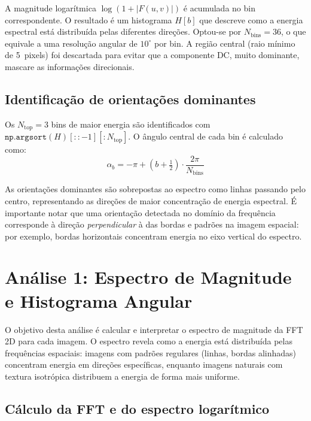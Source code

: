 \documentclass[12pt,a4paper]{article}
\begin{document}
A magnitude logarítmica $\log(1+|F(u,v)|)$ é acumulada no bin correspondente.
O resultado é um histograma $H[b]$ que descreve como a energia espectral está
distribuída pelas diferentes direções.
Optou-se por $N_{\text{bins}} = 36$, o que equivale a uma resolução angular de $10^\circ$ por bin.
A região central (raio mínimo de 5~pixels) foi descartada para evitar que a componente DC,
muito dominante, mascare as informações direcionais.

\subsection{Identificação de orientações dominantes}

Os $N_{\text{top}} = 3$ bins de maior energia são identificados com
$\texttt{np.argsort}(H)[::-1][:N_{\text{top}}]$.
O ângulo central de cada bin é calculado como:
\begin{equation}
  \alpha_b = -\pi + \left(b + \tfrac{1}{2}\right) \cdot \frac{2\pi}{N_{\text{bins}}}
\end{equation}

As orientações dominantes são sobrepostas ao espectro como linhas passando pelo centro,
representando as direções de maior concentração de energia espectral.
É importante notar que uma orientação detectada no domínio da frequência corresponde à
direção \emph{perpendicular} à das bordas e padrões na imagem espacial: por exemplo,
bordas horizontais concentram energia no eixo vertical do espectro.

\section{Análise 1: Espectro de Magnitude e Histograma Angular}
\label{sec:espectro}

O objetivo desta análise é calcular e interpretar o espectro de magnitude da FFT 2D
para cada imagem. O espectro revela como a energia está distribuída pelas frequências
espaciais: imagens com padrões regulares (linhas, bordas alinhadas) concentram energia
em direções específicas, enquanto imagens naturais com textura isotrópica distribuem a
energia de forma mais uniforme.

\subsection{Cálculo da FFT e do espectro logarítmico}
\end{document}
